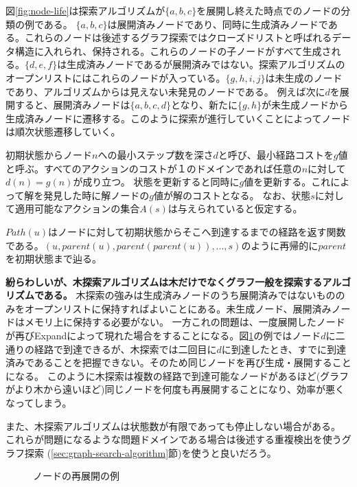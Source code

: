 図\ref{fig:node-life}は探索アルゴリズムが$\{a, b, c\}$を展開し終えた時点でのノードの分類の例である。
$\{a, b, c\}$は展開済みノードであり、同時に生成済みノードである。これらのノードは後述するグラフ探索ではクローズドリストと呼ばれるデータ構造に入れられ、保持される。これらのノードの子ノードがすべて生成される。$\{d, e, f\}$は生成済みノードであるが展開済みではない。探索アルゴリズムのオープンリストにはこれらのノードが入っている。$\{g, h, i, j\}$は未生成のノードであり、アルゴリズムからは見えない未発見のノードである。
例えば次に$d$を展開すると、展開済みノードは$\{a, b, c, d\}$となり、新たに$\{g, h\}$が未生成ノードから生成済みノードに遷移する。このように探索が進行していくことによってノードは順次状態遷移していく。


初期状態からノード$n$への最小ステップ数を深さ$d$と呼び、最小経路コストを$g$値と呼ぶ。すべてのアクションのコストが１のドメインであれば任意の$n$に対して$d(n) = g(n)$が成り立つ。
状態を更新すると同時に$g$値を更新する。これによって解を発見した時に解ノードの$g$値が解のコストとなる。
なお、状態$s$に対して適用可能なアクションの集合$A(s)$は与えられていると仮定する。

$Path(u)$はノードに対して初期状態からそこへ到達するまでの経路を返す関数である。$(u, parent(u), parent(parent(u)),...,s)$のように再帰的に$parent$を初期状態まで辿る。

{\bf 紛らわしいが、木探索アルゴリズムは木だけでなくグラフ一般を探索するアルゴリズムである。}
木探索の強みは生成済みノードのうち展開済みではないもののみをオープンリストに保持すればよいことにある。未生成ノード、展開済みノードはメモリ上に保持する必要がない。
一方これの問題は、一度展開したノードが再びExpandによって現れた場合をすることになる。図\ref{fig:reexpansion}の例ではノード$d$に二通りの経路で到達できるが、木探索では二回目に$d$に到達したとき、すでに到達済みであることを把握できない。そのため同じノードを再び生成・展開することになる。
このように木探索は複数の経路で到達可能なノードがあるほど(グラフがより木から遠いほど)同じノードを何度も再展開することになり、効率が悪くなってしまう。

また、木探索アルゴリズムは状態数が有限であっても停止しない場合がある。
これらが問題になるような問題ドメインである場合は後述する重複検出を使うグラフ探索 (\ref{sec:graph-search-algorithm}節)を使うと良いだろう。


\begin{figure}
  \centering
  \begin{tikzpicture}[scale=0.5]
    
  \end{tikzpicture}
  \caption{ノードの再展開の例}
  \label{fig:reexpansion}
\end{figure}


